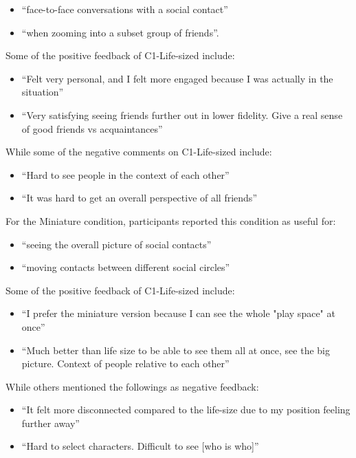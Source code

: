 \begin{itemize}
    \item \enquote{face-to-face conversations with a social contact}
    \item \enquote{when zooming into a subset group of friends}. 
\end{itemize}

Some of the positive feedback of C1-Life-sized include:

\begin{itemize}
    \item \enquote{Felt very personal, and I felt more engaged because I was actually in the situation}
    \item \enquote{Very satisfying seeing friends further out in lower fidelity. Give a real sense of good friends vs acquaintances}
\end{itemize}

While some of the negative comments on C1-Life-sized include:

\begin{itemize}
    \item \enquote{Hard to see people in the context of each other}
    \item \enquote{It was hard to get an overall perspective of all friends}
\end{itemize}
 
For the Miniature condition, participants reported this condition as useful for: 

\begin{itemize}
    \item \enquote{seeing the overall picture of social contacts} 
    \item \enquote{moving contacts between different social circles} 
\end{itemize}

Some of the positive feedback of C1-Life-sized include:

\begin{itemize}
    \item \enquote{I prefer the miniature version because I can see the whole "play space" at once}
    \item \enquote{Much better than life size to be able to see them all at once, see the big picture. Context of people relative to each other}
\end{itemize}

While others mentioned the followings as negative feedback: 

\begin{itemize}
    \item \enquote{It felt more disconnected compared to the life-size due to my position feeling further away}
    \item \enquote{Hard to select characters. Difficult to see [who is who]}
\end{itemize}


